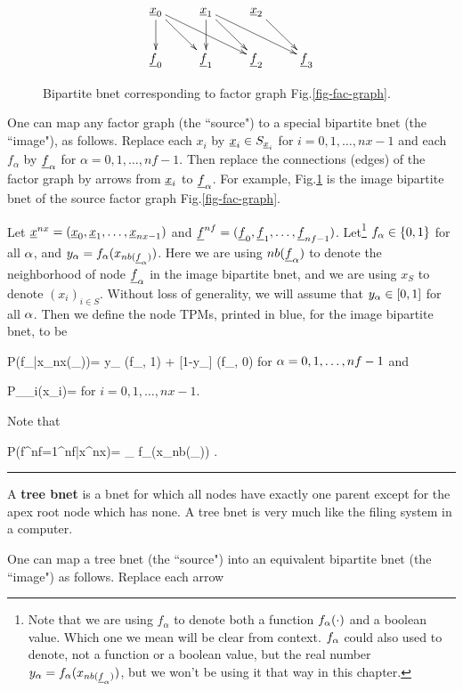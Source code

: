 \begin{figure}[h!]
\centering
$$\xymatrix{
\rvx_0\ar[d]\ar[dr]\ar[drr]
&\rvx_1\ar[d]\ar[dr]\ar[drr]
&\rvx_2\ar[dr]
\\
\rvf_0&\rvf_1&\rvf_2&\rvf_3
}$$
\caption{Bipartite bnet
corresponding to factor
graph Fig.\ref{fig-fac-graph}.}
\label{fig-bip-bnet}
\end{figure}

One
can map
any factor graph (the ``source")
to a special bipartite bnet (the ``image"),
as follows.
Replace each $x_i$ by ${\underline{x}}_i\in S_{{\underline{x}}_i}$
for $i=0,1, \ldots, nx-1$
 and each
 $f_\alpha$ by ${\underline{f}}_\alpha$
for $\alpha=0, 1, \ldots, nf-1$.
Then replace
the connections (edges)
of the factor graph
by arrows from ${\underline{x}}_i$ to
${\underline{f}}_\alpha$. For example,
Fig.\ref{fig-bip-bnet}
is the image bipartite bnet of the source factor
graph Fig.\ref{fig-fac-graph}.


Let ${\underline{x}}^{nx}=
({\underline{x}}_0, {\underline{x}}_1, \ldots, {\underline{x}}_{nx-1})$
and
${\underline{f}}^{nf}=
({\underline{f}}_0, {\underline{f}}_1, \ldots, {\underline{f}}_{nf-1})$.
Let\footnote{
Note that we are using
$f_\alpha$
to denote both a function
$f_\alpha(\cdot)$  and a boolean
value. Which one we mean
will be clear from context.
$f_\alpha$ could also used to
denote, not a function or a boolean value,
but
the real number
$y_\alpha=f_\alpha(x_{nb({\underline{f}}_\alpha)})$,
but we won't be using it that way
in this chapter.}
$f_\alpha\in \{0,1\}$ for all $\alpha$,
and $y_\alpha=
f_\alpha(x_{nb({\underline{f}}_\alpha)})$.
Here we are using $nb({\underline{f}}_\alpha)$
to denote  the neighborhood
of node ${\underline{f}}_\alpha$
in the image bipartite bnet,
and we are using $x_S$ to denote
$(x_i)_{i\in S}$.
Without loss of
generality,
we will assume
that $y_\alpha\in[0,1]$ for all $\alpha$.
Then we define the node TPMs, printed
in blue, for the
image bipartite bnet, to be




\beq\color{blue}
P(f_\alpha|x_{nx(\rvf_\alpha)})=
y_\alp
\delta(f_\alp, 1)
+
[1-y_\alp]
\delta(f_\alp, 0)
\;
\eeq
for $\alpha=0, 1, \ldots , nf-1$
and

\beq\color{blue}
P_{\rvx_i}(x_i)= 
\eeq
for $i=0, 1, \ldots, nx-1$.

Note that

\beq
P(f^{nf}=1^{nf}|x^{nx})=
\prod_\alpha
f_\alpha(x_{nb(\rvf_\alpha)})
\;.
\eeq

\hrule
A {\bf tree bnet}
is a bnet for which all
nodes have exactly
one parent except
for the apex root
node which has none.
A tree bnet
is very much like
the filing system
in a computer.

One can map a tree
 bnet (the ``source")
into
an equivalent
bipartite bnet (the ``image") as follows.
Replace
each arrow

